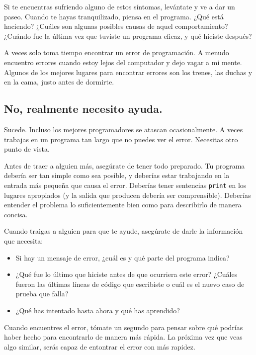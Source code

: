 \documentclass[10pt]{book}
\begin{document}
Si te encuentras sufriendo alguno de estos síntomas, levántate
y ve a dar un paseo.  Cuando te hayas tranquilizado, piensa en el programa.
¿Qué está haciendo?  ¿Cuáles son algunas posibles causas de aquel
comportamiento?  ¿Cuándo fue la última vez que tuviste un programa eficaz,
y qué hiciste después?

A veces solo toma tiempo encontrar un error de programación.  A menudo
encuentro errores cuando estoy lejos del computador y dejo vagar a mi mente.
Algunos de los mejores lugares para encontrar errores son los trenes, las
duchas y en la cama, justo antes de dormirte.


\subsection{No, realmente necesito ayuda.}

Sucede.  Incluso los mejores programadores se atascan ocasionalmente.
A veces trabajas en un programa tan largo que no puedes ver el
error.  Necesitas otro punto de vista.

Antes de traer a alguien más, asegúrate de tener todo preparado.
Tu programa debería ser tan simple
como sea posible, y deberías estar trabajando en la entrada más pequeña
que causa el error.  Deberías tener sentencias {\tt print} en los
lugares apropiados (y la salida que producen debería ser
comprensible).  Deberías entender el problema lo suficientemente bien
como para describirlo de manera concisa.

Cuando traigas a alguien para que te ayude, asegúrate de darle
la información que necesita:

\begin{itemize}

\item Si hay un mensaje de error, ¿cuál es
y qué parte del programa indica?

\item ¿Qué fue lo último que hiciste antes de que ocurriera este error?
¿Cuáles fueron las últimas líneas de código que escribiste o cuál es
el nuevo caso de prueba que falla?

\item ¿Qué has intentado hasta ahora y qué has aprendido?

\end{itemize}

Cuando encuentres el error, tómate un segundo para pensar sobre qué
podrías haber hecho para encontrarlo de manera más rápida.  La próxima vez
que veas algo similar, serás capaz de entontrar el error con más rapidez.
\end{document}
